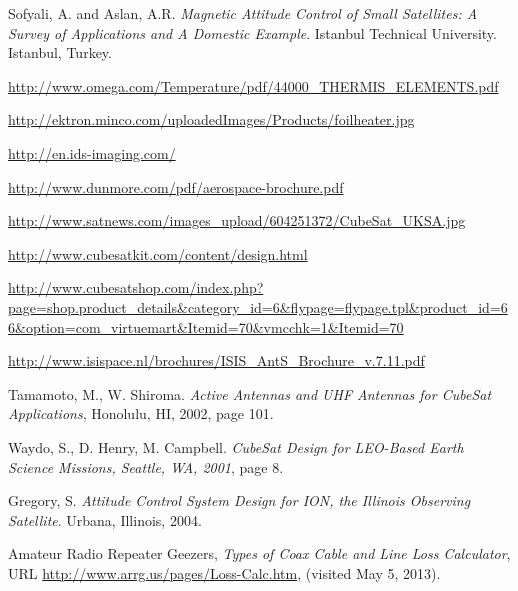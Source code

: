 \documentclass[12pt]{article}
\begin{document}
\begin{thebibliography}{99}
Sofyali, A. and Aslan, A.R. \emph{Magnetic Attitude Control of Small Satellites: A Survey of Applications and A Domestic Example}. Istanbul Technical University. Istanbul, Turkey. 


\url{http://www.omega.com/Temperature/pdf/44000_THERMIS_ELEMENTS.pdf}

\url{http://ektron.minco.com/uploadedImages/Products/foilheater.jpg}

\url{http://en.ids-imaging.com/}

\url{http://www.dunmore.com/pdf/aerospace-brochure.pdf}

\url{http://www.satnews.com/images_upload/604251372/CubeSat_UKSA.jpg}


\url{http://www.cubesatkit.com/content/design.html}

\url{http://www.cubesatshop.com/index.php?page=shop.product_details&category_id=6&flypage=flypage.tpl&product_id=66&option=com_virtuemart&Itemid=70&vmcchk=1&Itemid=70}

\url{http://www.isispace.nl/brochures/ISIS_AntS_Brochure_v.7.11.pdf}

Tamamoto, M., W. Shiroma. \emph{Active Antennas and UHF Antennas for CubeSat Applications}, Honolulu, HI, 2002, page 101.

Waydo, S., D. Henry, M. Campbell. \emph{CubeSat Design for LEO-Based Earth Science Missions, Seattle, WA, 2001}, page 8.


Gregory, S. \emph{Attitude Control System Design for ION, the Illinois Observing Satellite}. Urbana, Illinois, 2004. 

Amateur Radio Repeater Geezers, \emph{Types of Coax Cable and Line Loss Calculator}, URL \url{http://www.arrg.us/pages/Loss-Calc.htm}, (visited May 5, 2013).



\end{thebibliography}
\end{document}
